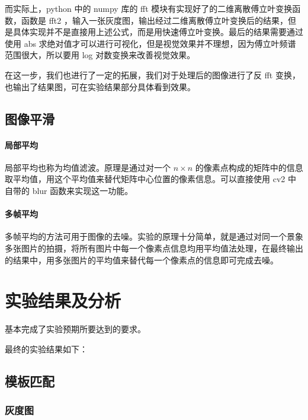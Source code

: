 \documentclass[11pt]{ctexart}
\begin{document}
而实际上，python 中的 numpy 库的 fft 模块有实现好了的二维离散傅立叶变换函数，函数是 fft2 ，输入一张灰度图，输出经过二维离散傅立叶变换后的结果，但是具体实现并不是直接用上述公式，而是用快速傅立叶变换。最后的结果需要通过使用 abs 求绝对值才可以进行可视化，但是视觉效果并不理想，因为傅立叶频谱范围很大，所以要用 log 对数变换来改善视觉效果。

在这一步，我们也进行了一定的拓展，我们对于处理后的图像进行了反 fft 变换，也输出了结果图，可在实验结果部分具体看到效果。

\subsection{图像平滑}

\paragraph{局部平均}

局部平均也称为均值滤波。原理是通过对一个 $n\times n$ 的像素点构成的矩阵中的信息取平均值，用这个平均值来替代矩阵中心位置的像素信息。可以直接使用 cv2 中自带的 blur 函数来实现这一功能。

\paragraph{多帧平均}

多帧平均的方法可用于图像的去噪。实验的原理十分简单，就是通过对同一个景象多张图片的拍摄，将所有图片中每一个像素点信息均用平均值法处理，在最终输出的结果中，用多张图片的平均值来替代每一个像素点的信息即可完成去噪。

\section{实验结果及分析}

基本完成了实验预期所要达到的要求。

最终的实验结果如下：

\subsection*{模板匹配}

\subsubsection*{灰度图}
\end{document}
